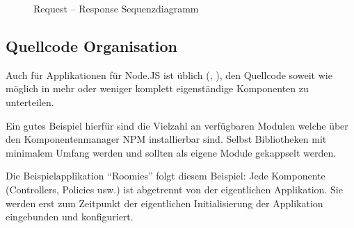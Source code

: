 \begin{figure}[ht!]
{{
		}
	}
	\caption{Request -- Response Sequenzdiagramm}
\end{figure}

\subsection{Quellcode Organisation}
Auch für Applikationen für Node.JS ist üblich (\cite{TJH_ComponentStructure}, \cite{IZS_ComponentStructure}), den Quellcode soweit wie möglich in mehr oder weniger komplett eigenständige Komponenten zu unterteilen.

Ein gutes Beispiel hierfür sind die Vielzahl an verfügbaren Modulen welche über den Komponentenmanager NPM \cite{NPM} installierbar sind. Selbst Bibliotheken mit minimalem Umfang werden und sollten als eigene Module gekappselt werden.

Die Beispielapplikation ``Roomies'' folgt diesem Beispiel: Jede Komponente (Controllers, Policies usw.) ist abgetrennt von der eigentlichen Applikation. Sie werden erst zum Zeitpunkt der eigentlichen Initialisierung der Applikation eingebunden und konfiguriert.\\[0.5mm]


